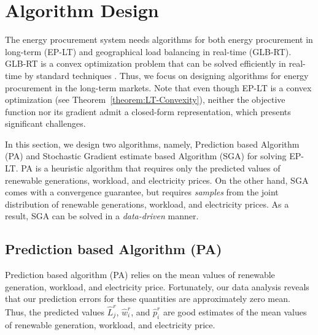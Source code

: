\section{Algorithm Design}
\label{sec:AlgorithmDesign}

The energy procurement system needs algorithms for both energy
procurement in long-term (EP-LT) and geographical load balancing in
real-time (GLB-RT). GLB-RT is a convex optimization problem that can
be solved efficiently in real-time by standard techniques
\cite{liu2011greening}. Thus, we focus on designing algorithms for
energy procurement in the long-term markets. Note that even though
EP-LT is a convex optimization (see
Theorem~\ref{theorem:LT-Convexity}), neither the objective function
nor its gradient admit a closed-form representation, which presents significant challenges. 

In this section,
we design two algorithms, namely, Prediction based Algorithm (PA) and
Stochastic Gradient estimate based Algorithm (SGA) for solving EP-LT.
PA is a heuristic algorithm that requires only the predicted values of renewable generations, workload, and
electricity prices. 
On the other hand, SGA comes with a convergence
guarantee, but requires \emph{samples} from the joint distribution of
renewable generations, workload, and electricity prices. As a result,
SGA can be solved in a \emph{data-driven} manner.
 
\subsection{Prediction based Algorithm (PA)}
\label{sec:PA}

Prediction based algorithm (PA) relies on the mean
values of renewable generation, workload, and electricity
price. 
Fortunately, our data analysis reveals that our prediction errors for
these quantities are approximately zero mean.
Thus, the predicted values $\hat{L}^r_j$, $\hat{w}^r_i$, and
$\hat{p}^r_i$ are good estimates of the mean values of renewable
generation, workload, and electricity price.

